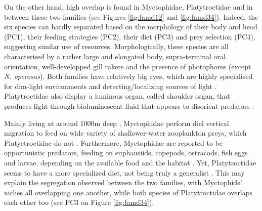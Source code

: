 On the other hand, high overlap is found in Myctophidae, Platytroctidae and in between these two families (see Figures \ref{fig:famd12} and \ref{fig:famd34}). Indeed, the six species can hardly separated based on the morphology of their body and head (PC1), their feeding strategies (PC2), their diet (PC3) and prey selection (PC4), suggesting similar use of resources. Morphologically, these species are all characterised by a rather large and elongated body, supra-terminal oral orientation, well-developped gill rakers and the presence of photophores (except \textit{N. operosus}). Both families have relatively big eyes, which are highly specialised for dim-light environments and detecting/localizing sources of light \citep{debusserolles2014,novotny2018}. Platytroctidae also display a luminous organ, called shoulder organ, that produces light through bioluminescent fluid that appears to disorient predators \citep{novotny2018}. 

Mainly living at around 1000m deep \citep{froese2019}, Myctophidae perform diel vertical migration to feed on wide variety of shallower-water zooplankton preys, which Platyctroctidae do not \citep{sutton2013a}. Furthermore, Myctophidae are reported to be opportunistic predators, feeding on euphausiids, copepods, ostracods, fish eggs and larvae, depending on the available food and the habitat \citet{catul2011,kozlov1995}. Yet, Platytroctidae seems to have a more specialized diet, not being truly a generalist \citet{novotny2018}. This may explain the segregation observed between the two families, with Myctophids' niches all overlapping one another, while both species of Platytroctidae overlaps each other too (see PC3 on Figure \ref{fig:famd34}).

